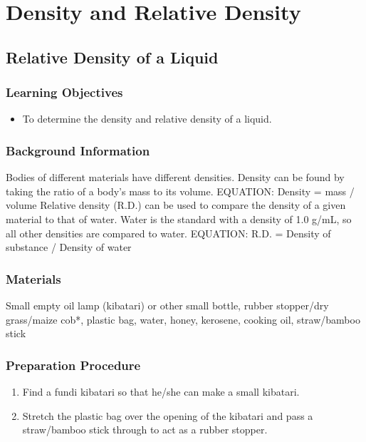 \section{Density and Relative Density}

\subsection{Relative Density of a Liquid}

\subsubsection*{Learning Objectives}
\begin{itemize}
\item{To determine the density and relative density of a liquid.} 
\end{itemize}

\subsubsection*{Background Information}
Bodies of different materials have different densities.  Density can be found by taking the ratio of a body's mass to its volume.  EQUATION: Density = mass / volume
Relative density (R.D.) can be used to compare the density of a given material to that of water.  Water is the standard with a density of 1.0 g/mL, so all other densities are compared to water.
EQUATION: R.D. = Density of substance / Density of water

\subsubsection*{Materials}
Small empty oil lamp (kibatari) or other small bottle, rubber stopper/dry grass/maize cob*, plastic bag, water, honey, kerosene, cooking oil, straw/bamboo stick

\subsubsection*{Preparation Procedure}
\begin{enumerate}
\item{Find a fundi kibatari so that he/she can make a small kibatari.} 
\item{Stretch the plastic bag over the opening of the kibatari and pass a straw/bamboo stick through to act as a rubber stopper.} 
\end{enumerate}

